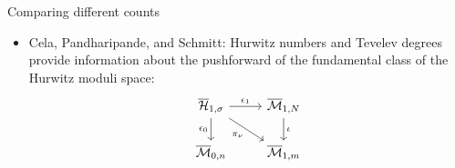 \documentclass{beamer}
\theoremstyle{definition}
\begin{document}
                                                                                                                                                                                                                          \begin{frame}{Comparing different counts}

                                                                                                                                                                                                                            \begin{itemize}
                                                                                                                                                                                                                            \item Cela, Pandharipande, and Schmitt: Hurwitz numbers and Tevelev degrees provide information about the pushforward
                                                                                                                                                                                                                              of the fundamental class of the Hurwitz moduli space:
                                                                                                                                                                                                                                \[\begin{tikzcd}[ampersand replacement=\&]
	{\overline{\mathcal H}_{1,\sigma}} \& {\overline{\mathcal M}_{1,N}} \\
	{\overline{\mathcal M}_{0,n}} \& {\overline{\mathcal M}_{1,m}}
	\arrow["{\epsilon_1}", from=1-1, to=1-2]
	\arrow["{\epsilon_0}"', from=1-1, to=2-1]
	\arrow["{\pi_{\nu}}"', from=1-1, to=2-2]
	\arrow["\iota", from=1-2, to=2-2]
                                                                                                                                                                                                                                \end{tikzcd}\]


\end{itemize}
\end{frame}
\end{document}

